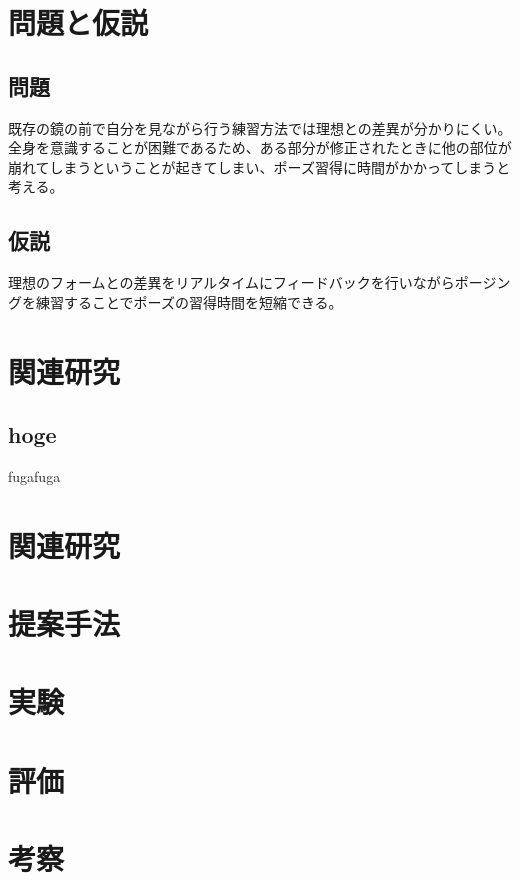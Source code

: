\documentclass[a4j,10pt]{jsarticle}
\begin{document}

\section{問題と仮説}
\subsection*{問題}
既存の鏡の前で自分を見ながら行う練習方法では理想との差異が分かりにくい。全身を意識することが困難であるため、ある部分が修正されたときに他の部位が崩れてしまうということが起きてしまい、ポーズ習得に時間がかかってしまうと考える。
\subsection*{仮説}
理想のフォームとの差異をリアルタイムにフィードバックを行いながらポージングを練習することでポーズの習得時間を短縮できる。
\section{関連研究}
\subsection{hoge}

 
fugafuga

\section{関連研究}

\section{提案手法}
\section{実験}
\section{評価}

\section{考察}



\end{document}
